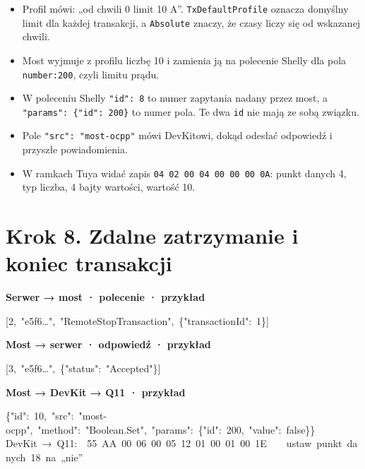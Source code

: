 \documentclass[11pt,a4paper]{article}
\begin{document}
\begin{itemize}
\item Profil mówi: „od chwili 0 limit 10 A”. \texttt{TxDefaultProfile} oznacza domyślny limit dla każdej transakcji, a \texttt{Absolute} znaczy, że czasy liczy się od wskazanej chwili.
\item Most wyjmuje z profilu liczbę 10 i zamienia ją na polecenie Shelly dla pola \texttt{number:200}, czyli limitu prądu.
\item W poleceniu Shelly \texttt{"id": 8} to numer zapytania nadany przez most, a \texttt{"params":\allowbreak{} \{"id":\allowbreak{} 200\}} to numer pola. Te dwa \texttt{id} nie mają ze sobą związku.
\item Pole \texttt{"src":\allowbreak{} "most-\allowbreak{}ocpp"} mówi DevKitowi, dokąd odesłać odpowiedź i przyszłe powiadomienia.
\item W ramkach Tuya widać zapis \texttt{04 02 00 04 00 00 00 0A}: punkt danych 4, typ liczba, 4 bajty wartości, wartość 10.
\end{itemize}

\section*{Krok 8. Zdalne zatrzymanie i koniec transakcji}

\textbf{Serwer {\symbolfont→} most · polecenie ·  przykład}


\begin{kodbox}
\mbox{}[2,\ "e5f6…",\ "RemoteStopTransaction",\ \{"transactionId":\ 1\}]
\end{kodbox}

\textbf{Most {\symbolfont→} serwer · odpowiedź ·  przykład}


\begin{kodbox}
\mbox{}[3,\ "e5f6…",\ \{"status":\ "Accepted"\}]
\end{kodbox}

\textbf{Most {\symbolfont→} DevKit {\symbolfont→} Q11 ·  przykład}


\begin{kodbox}
\mbox{}\{"id":\ 10,\ "src":\ "most-ocpp",\ "method":\ "Boolean.Set",\ "params":\ \{"id":\ 200,\ "value":\ false\}\}\\
\mbox{}DevKit\ {\symbolfont→}\ Q11:\ \ 55\ AA\ 00\ 06\ 00\ 05\ 12\ 01\ 00\ 01\ 00\ 1E\ \ \ \ ustaw\ punkt\ danych\ 18\ na\ „nie”
\end{kodbox}
\end{document}
